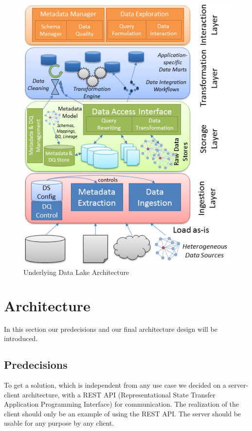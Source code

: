 \documentclass[conference]{IEEEtran}
\begin{document}
\begin{figure}[h]
\centerline{\includegraphics[scale=0.5]{graphics/data_lake_architecture.PNG}}
\caption{Underlying Data Lake Architecture\cite{Quix_Architecture}}
\label{DLA}
\end{figure}

\section{Architecture}\label{ARC}
In this section our predecisions and our final architecture design will be introduced.
\subsection{Predecisions}\label{PRE}
To get a solution, which is independent from any use case we decided on a server-client 
architecture, with a REST API (Representational State Transfer Application Programming Interface) 
for communication. 
The realization of the client should only be an example of using the REST API.
The server should be usable for any purpose by any client.
\end{document}
